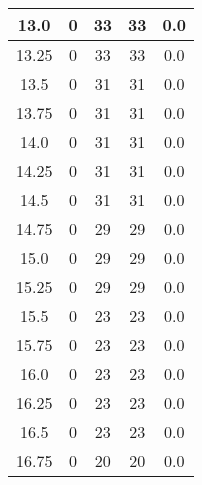 \documentclass[letterpaper, 12pt]{article}
\begin{document}
\begin{longtable}{|c|c|c|c|c|}
\hline
13.0 & 0 & 33 & 33 & 0.0 \\
\hline
13.25 & 0 & 33 & 33 & 0.0 \\
\hline
13.5 & 0 & 31 & 31 & 0.0 \\
\hline
13.75 & 0 & 31 & 31 & 0.0 \\
\hline
14.0 & 0 & 31 & 31 & 0.0 \\
\hline
14.25 & 0 & 31 & 31 & 0.0 \\
\hline
14.5 & 0 & 31 & 31 & 0.0 \\
\hline
14.75 & 0 & 29 & 29 & 0.0 \\
\hline
15.0 & 0 & 29 & 29 & 0.0 \\
\hline
15.25 & 0 & 29 & 29 & 0.0 \\
\hline
15.5 & 0 & 23 & 23 & 0.0 \\
\hline
15.75 & 0 & 23 & 23 & 0.0 \\
\hline
16.0 & 0 & 23 & 23 & 0.0 \\
\hline
16.25 & 0 & 23 & 23 & 0.0 \\
\hline
16.5 & 0 & 23 & 23 & 0.0 \\
\hline
16.75 & 0 & 20 & 20 & 0.0 \\
\hline
\end{longtable}
\end{document}
